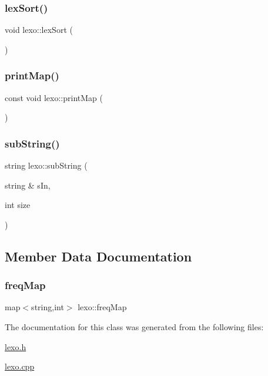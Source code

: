 \mbox{\label{classlexo_ac8001ad317bfa10094990fc5d8c6ae10}} 
\subsubsection{\texorpdfstring{lex\+Sort()}{lexSort()}}
{\footnotesize\ttfamily void lexo\+::lex\+Sort (\begin{DoxyParamCaption}{ }\end{DoxyParamCaption})}

\mbox{\label{classlexo_af37343d245d4ca3d53e100cdf9f5ec02}} 
\subsubsection{\texorpdfstring{print\+Map()}{printMap()}}
{\footnotesize\ttfamily const void lexo\+::print\+Map (\begin{DoxyParamCaption}{ }\end{DoxyParamCaption})}

\mbox{\label{classlexo_a0e0470fe5a129ab3368044af5c48fc66}} 
\subsubsection{\texorpdfstring{sub\+String()}{subString()}}
{\footnotesize\ttfamily string lexo\+::sub\+String (\begin{DoxyParamCaption}\item[{string \&}]{s\+In,  }\item[{int}]{size }\end{DoxyParamCaption})}



\subsection{Member Data Documentation}
\mbox{\label{classlexo_afc2b084af343d8f4ef8d1901db978035}} 
\subsubsection{\texorpdfstring{freq\+Map}{freqMap}}
{\footnotesize\ttfamily map$<$string,int$>$ lexo\+::freq\+Map}



The documentation for this class was generated from the following files\+:\begin{DoxyCompactItemize}
\item 
\hyperlink{lexo_8h}{lexo.\+h}\item 
\hyperlink{lexo_8cpp}{lexo.\+cpp}\end{DoxyCompactItemize}
